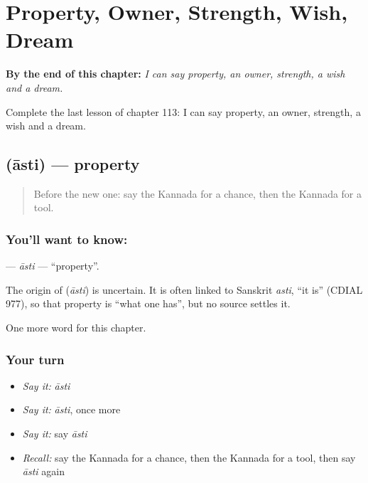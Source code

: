 
\chapter{Property, Owner, Strength, Wish, Dream}
\label{ch:ka-property-owner-strength-wish-dream}

\begin{chapteropening}
\textbf{By the end of this chapter:} \emph{I can say property, an owner, strength, a wish and a dream.}

Complete the last lesson of chapter 113: I can say property, an owner, strength, a wish and a dream.
\end{chapteropening}

\section[\texorpdfstring{\kn{ಆಸ್ತಿ} (āsti)}{ಆಸ್ತಿ (āsti)}]{ (āsti) — property}

\label{lesson:KA-C113-asti}



\begin{quote}
Before the new one: say the Kannada for a chance, then the Kannada for a tool.
\end{quote}

\subsection*{You'll want to know: }
\textbf{} — \emph{āsti} — \textquotedblleft{}property\textquotedblright{}.

\begin{cousinweb}
The origin of \textbf{} (\emph{āsti}) is uncertain. It is often linked to Sanskrit \emph{asti}, \textquotedblleft{}it is\textquotedblright{} (CDIAL 977), so that property is \textquotedblleft{}what one has\textquotedblright{}, but no source settles it.
\end{cousinweb}

\begin{grammarlens}[title={What you've built}]
One more word for this chapter.
\end{grammarlens}

\subsection*{Your turn}
\begin{itemize}
\raggedright
  \item \emph{Say it:} \emph{āsti}
  \item \emph{Say it:} \emph{āsti}, once more
  \item \emph{Say it:} say \emph{āsti}
  \item \emph{Recall:} say the Kannada for a chance, then the Kannada for a tool, then say \emph{āsti} again
\end{itemize}

